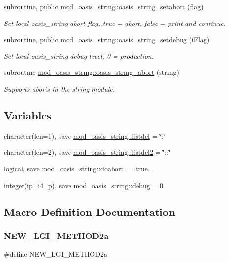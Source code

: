 \begin{DoxyCompactItemize}
subroutine, public \hyperlink{namespacemod__oasis__string_a10977c4902f912074ef3effd86630a24}{mod\+\_\+oasis\+\_\+string\+::oasis\+\_\+string\+\_\+setabort} (flag)
\begin{DoxyCompactList}\small\item\em Set local oasis\+\_\+string abort flag, true = abort, false = print and continue. \end{DoxyCompactList}\item 
subroutine, public \hyperlink{namespacemod__oasis__string_af5c49843654a2bc9ccedf2934571329d}{mod\+\_\+oasis\+\_\+string\+::oasis\+\_\+string\+\_\+setdebug} (i\+Flag)
\begin{DoxyCompactList}\small\item\em Set local oasis\+\_\+string debug level, 0 = production. \end{DoxyCompactList}\item 
subroutine \hyperlink{namespacemod__oasis__string_a86c2c26b793c41219bc833beb992d0e3}{mod\+\_\+oasis\+\_\+string\+::oasis\+\_\+string\+\_\+abort} (string)
\begin{DoxyCompactList}\small\item\em Supports aborts in the string module. \end{DoxyCompactList}\end{DoxyCompactItemize}
\subsection*{Variables}
\begin{DoxyCompactItemize}
\item 
character(len=1), save \hyperlink{namespacemod__oasis__string_aa6f905efb4869a52d8bb2414e82bb0a7}{mod\+\_\+oasis\+\_\+string\+::listdel} = \char`\"{}\+:\char`\"{}
\item 
character(len=2), save \hyperlink{namespacemod__oasis__string_a9b40ad6f4785bd4765a24b6337185513}{mod\+\_\+oasis\+\_\+string\+::listdel2} = \char`\"{}\+::\char`\"{}
\item 
logical, save \hyperlink{namespacemod__oasis__string_a59e9b1145c7c14506941e6495b237395}{mod\+\_\+oasis\+\_\+string\+::doabort} = .true.
\item 
integer(ip\+\_\+i4\+\_\+p), save \hyperlink{namespacemod__oasis__string_a84408befb8bedabf75507eb4d690cea9}{mod\+\_\+oasis\+\_\+string\+::debug} = 0
\end{DoxyCompactItemize}


\subsection{Macro Definition Documentation}
\mbox{\label{mod__oasis__string_8_f90_a732dc6b61280242f5cf9c6b817dfd452}} 
\subsubsection{\texorpdfstring{N\+E\+W\+\_\+\+L\+G\+I\+\_\+\+M\+E\+T\+H\+O\+D2a}{NEW\_LGI\_METHOD2a}}
{\footnotesize\ttfamily \#define N\+E\+W\+\_\+\+L\+G\+I\+\_\+\+M\+E\+T\+H\+O\+D2a}

